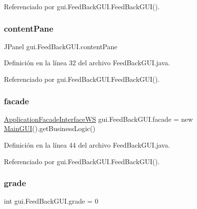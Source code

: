 Referenciado por gui.\+Feed\+Back\+G\+U\+I.\+Feed\+Back\+G\+U\+I().

\mbox{\label{classgui_1_1_feed_back_g_u_i_ae4711a299230e0f571f2b3f56f5eb9ee}} 
\subsubsection{\texorpdfstring{contentPane}{contentPane}}
{\footnotesize\ttfamily J\+Panel gui.\+Feed\+Back\+G\+U\+I.\+content\+Pane\hspace{0.3cm}{\ttfamily [private]}}



Definición en la línea 32 del archivo Feed\+Back\+G\+U\+I.\+java.



Referenciado por gui.\+Feed\+Back\+G\+U\+I.\+Feed\+Back\+G\+U\+I().

\mbox{\label{classgui_1_1_feed_back_g_u_i_a62c1845c6e8a5824711746f6bdf7a202}} 
\subsubsection{\texorpdfstring{facade}{facade}}
{\footnotesize\ttfamily \mbox{\hyperlink{interfacebusiness_logic_1_1_application_facade_interface_w_s}{Application\+Facade\+Interface\+WS}} gui.\+Feed\+Back\+G\+U\+I.\+facade = new \mbox{\hyperlink{classgui_1_1_main_g_u_i}{Main\+G\+UI}}().get\+Business\+Logic()\hspace{0.3cm}{\ttfamily [private]}}



Definición en la línea 44 del archivo Feed\+Back\+G\+U\+I.\+java.



Referenciado por gui.\+Feed\+Back\+G\+U\+I.\+Feed\+Back\+G\+U\+I().

\mbox{\label{classgui_1_1_feed_back_g_u_i_ab9e6f952b77fa96772b8e417245d94bb}} 
\subsubsection{\texorpdfstring{grade}{grade}}
{\footnotesize\ttfamily int gui.\+Feed\+Back\+G\+U\+I.\+grade = 0\hspace{0.3cm}{\ttfamily [private]}}



